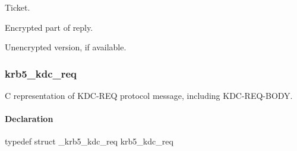 \documentclass[letterpaper,10pt,english]{sphinxmanual}
\begin{document}

\begin{fulllineitems}
\label{appdev/refs/types/krb5_kdc_rep:krb5_kdc_rep.ticket}
Ticket.

\end{fulllineitems}


\begin{fulllineitems}
\label{appdev/refs/types/krb5_kdc_rep:krb5_kdc_rep.enc_part}
Encrypted part of reply.

\end{fulllineitems}


\begin{fulllineitems}
\label{appdev/refs/types/krb5_kdc_rep:krb5_kdc_rep.enc_part2}
Unencrypted version, if available.

\end{fulllineitems}



\subsubsection{krb5\_kdc\_req}
\label{appdev/refs/types/krb5_kdc_req:krb5-kdc-req-struct}\label{appdev/refs/types/krb5_kdc_req:krb5-kdc-req}\label{appdev/refs/types/krb5_kdc_req::doc}

\begin{fulllineitems}
\label{appdev/refs/types/krb5_kdc_req:krb5_kdc_req}
\end{fulllineitems}


C representation of KDC-REQ protocol message, including KDC-REQ-BODY.


\paragraph{Declaration}
\label{appdev/refs/types/krb5_kdc_req:declaration}
typedef struct \_krb5\_kdc\_req  krb5\_kdc\_req
\end{document}
